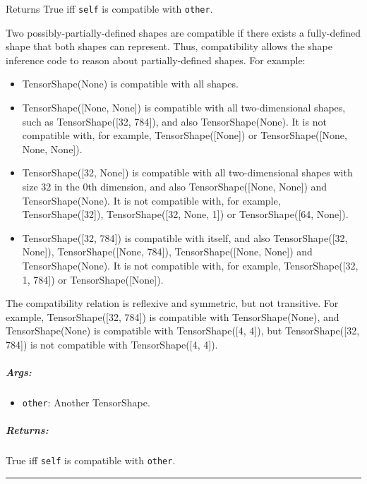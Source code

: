 Returns True iff \lstinline{self} is compatible with \lstinline{other}.

Two possibly-partially-defined shapes are compatible if there exists a
fully-defined shape that both shapes can represent. Thus, compatibility
allows the shape inference code to reason about partially-defined
shapes. For example:

\begin{itemize}
\item
  TensorShape(None) is compatible with all shapes.
\item
  TensorShape({[}None, None{]}) is compatible with all two-dimensional
  shapes, such as TensorShape({[}32, 784{]}), and also
  TensorShape(None). It is not compatible with, for example,
  TensorShape({[}None{]}) or TensorShape({[}None, None, None{]}).
\item
  TensorShape({[}32, None{]}) is compatible with all two-dimensional
  shapes with size 32 in the 0th dimension, and also
  TensorShape({[}None, None{]}) and TensorShape(None). It is not
  compatible with, for example, TensorShape({[}32{]}),
  TensorShape({[}32, None, 1{]}) or TensorShape({[}64, None{]}).
\item
  TensorShape({[}32, 784{]}) is compatible with itself, and also
  TensorShape({[}32, None{]}), TensorShape({[}None, 784{]}),
  TensorShape({[}None, None{]}) and TensorShape(None). It is not
  compatible with, for example, TensorShape({[}32, 1, 784{]}) or
  TensorShape({[}None{]}).
\end{itemize}

The compatibility relation is reflexive and symmetric, but not
transitive. For example, TensorShape({[}32, 784{]}) is compatible with
TensorShape(None), and TensorShape(None) is compatible with
TensorShape({[}4, 4{]}), but TensorShape({[}32, 784{]}) is not
compatible with TensorShape({[}4, 4{]}).

\subparagraph{Args: }\label{args-32}

\begin{itemize}
\tightlist
\item
  \lstinline{other}: Another TensorShape.
\end{itemize}

\subparagraph{Returns: }\label{returns-33}

True iff \lstinline{self} is compatible with \lstinline{other}.

\begin{center}\rule{0.5\linewidth}{\linethickness}\end{center}

